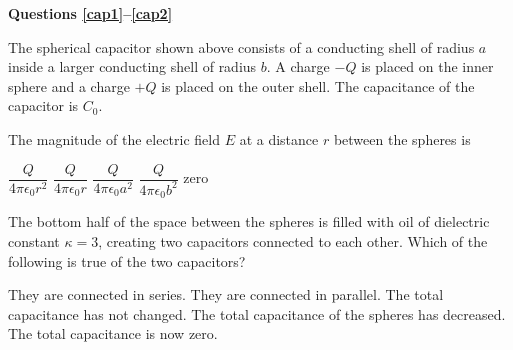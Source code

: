 \documentclass{../../oss-apphys-exam}
\begin{document}
\genheader


\genmultidirections
\raggedcolumns

\begin{multicols*}{2}
  \textbf{Questions \ref{cap1}--\ref{cap2}}

  \begin{center}
  \end{center}
  The spherical capacitor shown above consists of a conducting shell of
  radius $a$ inside a larger conducting shell of radius $b$. A charge $-Q$
  is placed on the inner sphere and a charge $+Q$ is placed on the outer
  shell. The capacitance of the capacitor is $C_0$.

  \begin{questions}
    \question The magnitude of the electric field $E$ at a distance $r$ between
    the spheres is
    \label{cap1}
    \begin{choices}
      \choice $\dfrac Q{4\pi\epsilon_0r^2}$
      \choice $\dfrac Q{4\pi\epsilon_0r}$
      \choice $\dfrac Q{4\pi\epsilon_0a^2}$
      \choice $\dfrac Q{4\pi\epsilon_0b^2}$
      \choice zero
    \end{choices}

    \question The bottom half of the space between the spheres is filled with
    oil of dielectric constant $\kappa=3$, creating two capacitors connected to
    each other. Which of the following is true of the two capacitors?
    \begin{center}
    \end{center}
    \begin{choices}
      \choice They are connected in series.
      \choice They are connected in parallel.
      \choice The total capacitance has not changed.
      \choice The total capacitance of the spheres has decreased.
      \choice The total capacitance is now zero.
    \end{choices}
    \vspace{.7in}
    

\end{questions}
\end{multicols*}
\end{document}
